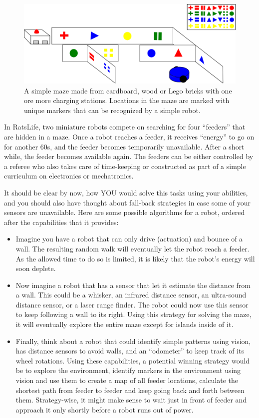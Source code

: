 \begin{figure}
	\centering
		\includegraphics[width=\textwidth]{figs/ratslife.png}
	\caption{A simple maze made from cardboard, wood or Lego bricks with one ore more charging stations. Locations in the maze are marked with unique markers that can be recognized by a simple robot.}
	\label{fig:ratslife}
\end{figure}



In RatsLife, two miniature robots  compete on searching for four ``feeders'' that are hidden in  a maze. Once a robot reaches a feeder, it receives ``energy'' to go on for another 60s, and the feeder becomes temporarily unavailable. After a short while, the feeder becomes available again. The feeders can be either controlled by a referee who also takes care of time-keeping or constructed as part of a simple curriculum on electronics or mechatronics. 

It should be clear by now, how YOU would solve this tasks using your abilities, and you should also have thought about fall-back strategies in case some of your sensors are unavailable. Here are some possible algorithms for a robot, ordered after the capabilities that it provides:
\begin{itemize}
\item Imagine you have a robot that can only drive (actuation) and bounce of a wall. The resulting random walk will eventually let the robot reach a feeder. As the allowed time to do so is limited, it is likely that the robot's energy will soon deplete.
\item Now imagine a robot that has a sensor that let it estimate the distance from a wall. This could be a whisker, an infrared distance sensor, an ultra-sound distance sensor, or a laser range finder. The robot could now use this sensor to keep following a wall to its right. Using this strategy for solving the maze, it will eventually explore the entire maze except for islands inside of it.
\item Finally, think about a robot that could identify simple patterns using vision, has distance sensors to avoid walls, and an ``odometer'' to keep track of its wheel rotations. Using these capabilities, a potential winning strategy would be to explore the environment, identify markers in the environment using vision and use them to create a map of all feeder locations, calculate the shortest path from feeder to feeder and keep going back and forth between them. Strategy-wise, it might make sense to wait just in front of feeder and approach it only shortly before a robot runs out of power.
\end{itemize}

